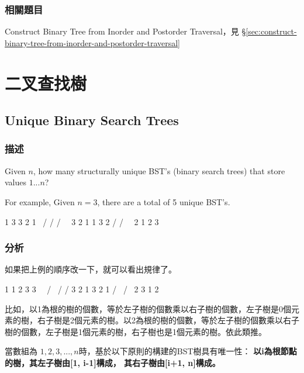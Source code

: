 \subsubsection{相關題目}
\begindot
\item Construct Binary Tree from Inorder and Postorder Traversal，見 \S \ref{sec:construct-binary-tree-from-inorder-and-postorder-traversal}
\myenddot



\section{二叉查找樹} %


\subsection{Unique Binary Search Trees}
\label{sec:unique-binary-search-trees}


\subsubsection{描述}
Given $n$, how many structurally unique BST's (binary search trees) that store values $1...n$?

For example,
Given $n = 3$, there are a total of 5 unique BST's.
\begin{Code}
   1         3     3      2      1
    \       /     /      / \      \
     3     2     1      1   3      2
    /     /       \                 \
   2     1         2                 3
\end{Code}

\subsubsection{分析}
如果把上例的順序改一下，就可以看出規律了。
\begin{Code}
 1       1           2          3       3
  \       \         / \        /       / 
   3       2       1   3      2       1
  /         \                /         \
2            3              1           2
\end{Code}

比如，以1為根的樹的個數，等於左子樹的個數乘以右子樹的個數，左子樹是0個元素的樹，右子樹是2個元素的樹。以2為根的樹的個數，等於左子樹的個數乘以右子樹的個數，左子樹是1個元素的樹，右子樹也是1個元素的樹。依此類推。

當數組為 $1,2,3,...,n$時，基於以下原則的構建的BST樹具有唯一性：
\textbf{以i為根節點的樹，其左子樹由[1, i-1]構成， 其右子樹由[i+1, n]構成。}

